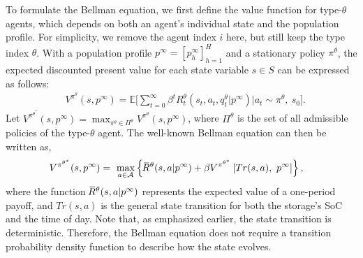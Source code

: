 \documentclass{article}
\theoremstyle{definition}
\theoremstyle{plain}
\newcommand{\overbar}[1]{\mkern1.5mu\overline{\mkern-3.0mu#1\mkern-1mu}\mkern 1.5mu}
\begin{document}
To formulate the Bellman equation, we first define the value function for type-$\theta$ agents, which depends on both an agent's individual state and the population profile. For simplicity, we remove the agent index $i$ here, but still keep the type index $\theta$. 
With  a population profile $p^{\infty}=[p^{\infty}_{h}]_{h=1}^{H}$ and a stationary policy $\pi^{\theta}$, the expected discounted present value for each state variable $s \in S$ can be expressed as follows:
\begin{align}
&  V^{\pi^{\theta}}(s, p^{\infty}) = \mathbb{E}\Bigg[\sum_{t=0}^{\infty} \beta^{t} 
R^{\theta}_{t}(s_{t}, a_{t}, q^{\theta}_t|p^{\infty})\bigg| a_{t}\sim\pi^{\theta} ,\ s_0\Bigg]. 
\end{align}
Let $V^{\pi^{\theta^*}}(s, p^{\infty}) = \max_{\pi^{\theta}\in\Pi^{\theta}}  V^{\pi^{\theta}}(s, p^{\infty})$, where $\Pi^{\theta}$ is the set of all admissible policies of the type-$\theta$ agent. 
The well-known Bellman equation can then be written as,
\begin{align}
&V^{\pi^{\theta^*}}(s, p^{\infty}) = \ \max_{a\in \mathcal{A}} \left\{\overbar{R}^{\theta}(s, a|p^{\infty}) + \beta  V^{\pi^{\theta^*}}\left[Tr(s,a),\ p^{\infty}\right]\right\}, \label{eq:Bellman} 
\end{align}
where the function $\overbar{R}^{\theta}(s, a|p^{\infty})$ represents the expected value of a one-period payoff, and  $Tr(s,a)$  is the general state transition for both the storage's SoC and the time of day. Note that, as emphasized earlier, the state transition is deterministic. Therefore, the Bellman equation does not require a transition probability density function to describe how the state evolves.
\end{document}

